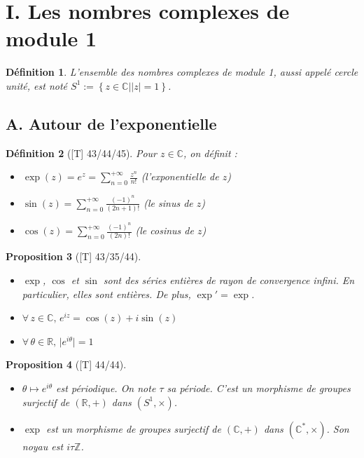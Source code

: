 \documentclass[10pt, a4paper, parskip=full, twoside, twocolumn]{report}
\newtheorem{definition}{Définition}
\newtheorem{proposition}[definition]{Proposition}
\newcommand{\IZ}{\mathbb{Z}}
\newcommand{\IC}{\mathbb{C}}
\newcommand{\IR}{\mathbb{R}}
\begin{document}
\section*{I. Les nombres complexes de module 1}
\begin{definition}
	L'ensemble des nombres complexes de module 1, aussi appelé \emph{cercle unité}, est noté $S^1:=\left\{z\in\IC\mid \vert z\vert = 1\right\}$.
\end{definition}

\subsection*{A. Autour de l'exponentielle}
\begin{definition}[\textnormal{[T] 43/44/45}]
	Pour $z\in\IC$, on définit :
	\begin{itemize}
		\item $\exp(z)=e^z = \sum_{n=0}^{+\infty} \frac{z^n}{n!}$ (l'\emph{exponentielle} de $z$)
		\item $\sin(z) = \sum_{n=0}^{+\infty} \frac{(-1)^n}{(2n+1)!}$ (le \emph{sinus} de $z$)
		\item $\cos(z) = \sum_{n=0}^{+\infty} \frac{(-1)^n}{(2n)!}$ (le \emph{cosinus} de $z$)
	\end{itemize}
\end{definition}

\begin{proposition}[\textnormal{[T] 43/35/44}]
	\begin{itemize}
		\item $\exp$, $\cos$ et $\sin$ sont des séries entières de rayon de convergence infini. En particulier, elles 
	sont entières. De plus, $\exp' = \exp$.
		\item $\forall\, z\in\IC,\, e^{iz}=\cos(z) + i\sin (z)$
		\item $\forall\, \theta\in\IR,\, \vert e^{i\theta}\vert=1$
	\end{itemize}
\end{proposition}

\begin{proposition}[\textnormal{[T] 44/44}]
	\begin{itemize}
		\item $\theta\mapsto e^{i\theta}$ est périodique. On note $\tau$ sa période. C'est un morphisme de groupes surjectif de $(\IR, +)$ dans $(S^1,\times)$.
		\item $\exp$ est un morphisme de groupes surjectif de $(\IC,+)$ dans $(\IC^*,\times)$. Son noyau est $i\tau\IZ$.
	\end{itemize}
\end{proposition}
\end{document}
